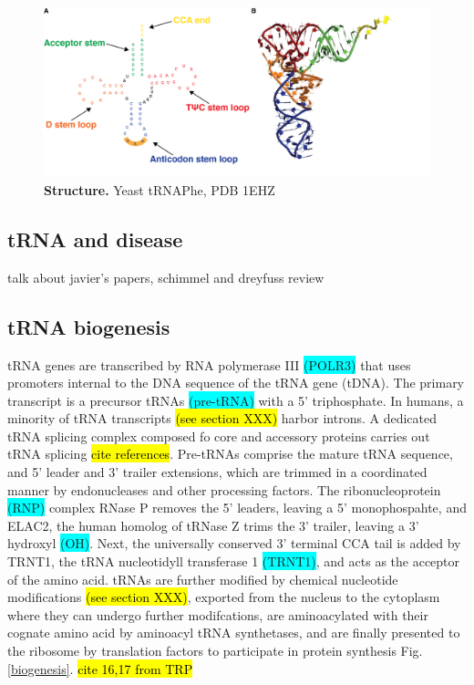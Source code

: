 \documentclass[12pt]{rockefeller}
\newcommand{\cyan}[1]{\colorbox{cyan}{#1}}
\begin{document}
\begin{figure}[!ht]%
\centering
\includegraphics[width=\textwidth]{tRNA_general_structure.png}%
\caption[tRNA structure]{\textbf{Structure.} Yeast tRNAPhe, PDB 1EHZ
}
\label{tRNAstructure}%
\end{figure}

\subsection{tRNA and disease} 
talk about javier's papers, schimmel and dreyfuss review

\subsection{tRNA biogenesis}
tRNA genes are transcribed by RNA polymerase III \cyan{(POLR3)} that uses promoters internal to the DNA sequence of the tRNA gene (tDNA). The primary transcript is a precursor tRNAs \cyan{(pre-tRNA)} with a 5' triphosphate. In humans, a minority of tRNA transcripts \hl{(see section XXX)} harbor introns. A dedicated tRNA splicing complex composed fo core and accessory proteins carries out tRNA splicing \hl{cite references}. Pre-tRNAs comprise the mature tRNA sequence, and 5' leader and 3' trailer extensions, which are trimmed in a coordinated manner by endonucleases and other processing factors. The ribonucleoprotein \cyan{(RNP)} complex RNase P removes the 5' leaders, leaving a 5' monophospahte, and ELAC2, the human homolog of tRNase Z trims the 3' trailer, leaving a 3' hydroxyl \cyan{(OH)}. Next, the universally conserved 3' terminal CCA tail is added by TRNT1, the tRNA nucleotidyll transferase 1 \cyan{(TRNT1)}, and acts as the acceptor of the amino acid. tRNAs are further modified by chemical nucleotide modifications \hl{(see section XXX)}, exported from the nucleus to the cytoplasm where they can undergo further modifcations, are aminoacylated with their cognate amino acid by aminoacyl tRNA synthetases, and are finally presented to the ribosome by translation factors to participate in protein synthesis Fig. \ref{biogenesis}. \hl{cite 16,17 from TRP}
\end{document}
